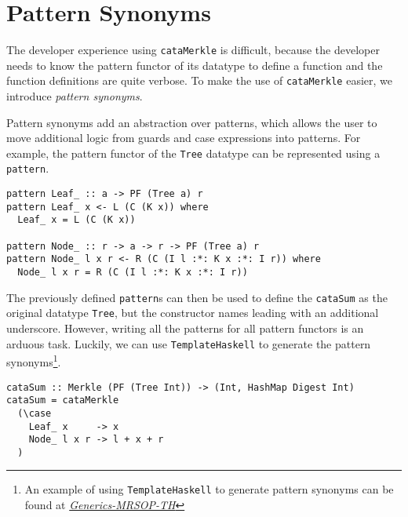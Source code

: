 \section{Pattern Synonyms}
\label{sec-patt-syn}

The developer experience using \texttt{cataMerkle} is difficult, because the developer needs to know the pattern functor of its datatype to define a function and the function definitions are quite verbose. To make the use of \texttt{cataMerkle} easier, we introduce \textit{pattern synonyms}\cite{pickering2016pattern}. 

Pattern synonyms add an abstraction over patterns, which allows the user to move additional logic from guards and case expressions into patterns. For example, the pattern functor of the \texttt{Tree} datatype can be represented using a \texttt{pattern}.

\begin{verbatim}
pattern Leaf_ :: a -> PF (Tree a) r
pattern Leaf_ x <- L (C (K x)) where
  Leaf_ x = L (C (K x))

pattern Node_ :: r -> a -> r -> PF (Tree a) r
pattern Node_ l x r <- R (C (I l :*: K x :*: I r)) where
  Node_ l x r = R (C (I l :*: K x :*: I r))
\end{verbatim}

The previously defined \texttt{pattern}s can then be used to define the \texttt{cataSum} as the original datatype \texttt{Tree}, but the constructor names leading with an additional underscore. However, writing all the patterns for all pattern functors is an arduous task. Luckily, we can use \texttt{TemplateHaskell} to generate the pattern synonyms\footnote{An example of using \texttt{TemplateHaskell} to generate pattern synonyms can be found at \href{https://hackage.haskell.org/package/generics-mrsop-2.3.0/docs/Generics-MRSOP-TH.html}{\textit{Generics-MRSOP-TH}}}.

\begin{verbatim}
cataSum :: Merkle (PF (Tree Int)) -> (Int, HashMap Digest Int)
cataSum = cataMerkle
  (\case
    Leaf_ x     -> x
    Node_ l x r -> l + x + r
  )
\end{verbatim}